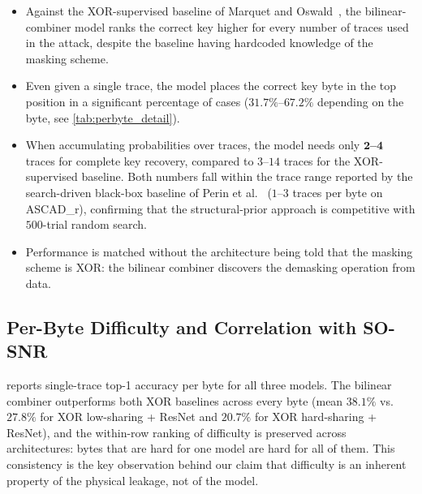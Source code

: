 \documentclass[runningheads]{llncs}
\begin{document}
\begin{itemize}[leftmargin=*]
  \item Against the XOR-supervised baseline of Marquet and Oswald~\cite{marquet2024exploring}, the bilinear-combiner model ranks the correct key higher for every number of traces used in the attack, despite the baseline having hardcoded knowledge of the masking scheme.

  \item Even given a single trace, the model places the correct key byte in the top position in a significant percentage of cases ($31.7\%$--$67.2\%$ depending on the byte, see \cref{tab:perbyte_detail}).

  \item When accumulating probabilities over traces, the model needs only $\mathbf{2}$\textbf{--}$\mathbf{4}$ traces for complete key recovery, compared to $3$--$14$ traces for the XOR-supervised baseline.
  Both numbers fall within the trace range reported by the search-driven black-box baseline of Perin et al.~\cite{perin2022exploring} ($1$--$3$ traces per byte on ASCAD\_r), confirming that the structural-prior approach is competitive with $500$-trial random search.

  \item Performance is matched without the architecture being told that the masking scheme is XOR: the bilinear combiner discovers the demasking operation from data.
\end{itemize}

\subsection{Per-Byte Difficulty and Correlation with SO-SNR}

 reports single-trace top-1 accuracy per byte for all three models.
The bilinear combiner outperforms both XOR baselines across every byte (mean $38.1\%$ vs.\ $27.8\%$ for XOR low-sharing + ResNet and $20.7\%$ for XOR hard-sharing + ResNet), and the within-row ranking of difficulty is preserved across architectures: bytes that are hard for one model are hard for all of them.
This consistency is the key observation behind our claim that difficulty is an inherent property of the physical leakage, not of the model.
\end{document}
